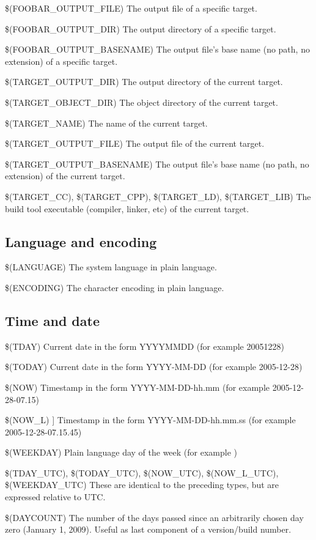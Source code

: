 \begin{codeentry}
\item[\$(FOOBAR\_OUTPUT\_FILE)] The output file of a specific target.
\item[\$(FOOBAR\_OUTPUT\_DIR)] The output directory of a specific target.
\item[\$(FOOBAR\_OUTPUT\_BASENAME)] The output file's base name (no path, no extension) of a specific target.
\item[\$(TARGET\_OUTPUT\_DIR)] The output directory of the current target.
\item[\$(TARGET\_OBJECT\_DIR)] The object directory of the current target.
\item[\$(TARGET\_NAME)] The name of the current target.
\item[\$(TARGET\_OUTPUT\_FILE)] The output file of the current target.
\item[\$(TARGET\_OUTPUT\_BASENAME)] The output file's base name (no path, no extension) of the current target.
\item[\$(TARGET\_CC), \$(TARGET\_CPP), \$(TARGET\_LD), \$(TARGET\_LIB)] The build tool executable (compiler, linker, etc) of the current target.
\end{codeentry}

\subsection{Language and encoding}

\begin{codeentry}
\item[\$(LANGUAGE)] The system language in plain language.
\item[\$(ENCODING)] The character encoding in plain language.
\end{codeentry}

\subsection{Time and date}

\begin{codeentry}
\item[\$(TDAY)] Current date in the form YYYYMMDD (for example 20051228)
\item[\$(TODAY)] Current date in the form YYYY-MM-DD (for example 2005-12-28)
\item[\$(NOW)] Timestamp in the form YYYY-MM-DD-hh.mm (for example 2005-12-28-07.15)
\item[\$(NOW\_L)]] Timestamp in the form YYYY-MM-DD-hh.mm.ss (for example 2005-12-28-07.15.45)
\item[\$(WEEKDAY)]  Plain language day of the week (for example )
\item[\$(TDAY\_UTC), \$(TODAY\_UTC), \$(NOW\_UTC), \$(NOW\_L\_UTC), \$(WEEKDAY\_UTC)] These are identical to the preceding types, but are expressed relative to UTC.
\item[\$(DAYCOUNT)] The number of the days passed since an arbitrarily chosen day zero (January 1, 2009). Useful as last component of a version/build number.
\end{codeentry}

